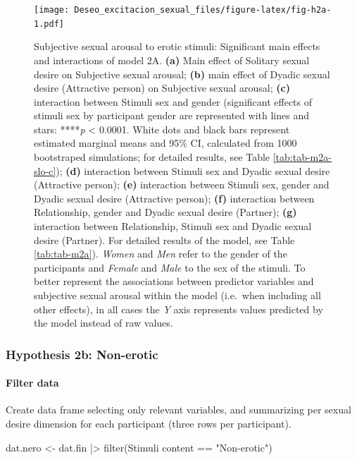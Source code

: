 \documentclass[
  bookmarksnumbered]{article}
\newenvironment{Shaded}{\begin{snugshade}}{\end{snugshade}}
\newcommand{\AttributeTok}[1]{\textcolor[rgb]{0.80,0.80,0.80}{#1}}
\newcommand{\FunctionTok}[1]{\textcolor[rgb]{0.94,0.94,0.56}{#1}}
\newcommand{\NormalTok}[1]{\textcolor[rgb]{0.80,0.80,0.80}{#1}}
\newcommand{\OtherTok}[1]{\textcolor[rgb]{0.94,0.94,0.56}{#1}}
\newcommand{\SpecialCharTok}[1]{\textcolor[rgb]{0.86,0.64,0.64}{#1}}
\newcommand{\StringTok}[1]{\textcolor[rgb]{0.80,0.58,0.58}{#1}}
\begin{document}
\begin{figure}
\centering
\texttt{[image: Deseo\_excitacion\_sexual\_files/figure-latex/fig-h2a-1.pdf]}
\caption{\label{fig:fig-h2a}Subjective sexual arousal to erotic stimuli: Significant main effects and interactions of model 2A. \textbf{(a)} Main effect of Solitary sexual desire on Subjective sexual arousal; \textbf{(b)} main effect of Dyadic sexual desire (Attractive person) on Subjective sexual arousal; \textbf{(c)} interaction between Stimuli sex and gender (significant effects of stimuli sex by participant gender are represented with lines and stars: ****\emph{p} \textless{} 0.0001. White dots and black bars represent estimated marginal means and 95\% CI, calculated from 1000 bootstraped simulations; for detailed results, see Table \ref{tab:tab-m2a-slo-c}); \textbf{(d)} interaction between Stimuli sex and Dyadic sexual desire (Attractive person); \textbf{(e)} interaction between Stimuli sex, gender and Dyadic sexual desire (Attractive person); \textbf{(f)} interaction between Relationship, gender and Dyadic sexual desire (Partner); \textbf{(g)} interaction between Relationship, Stimuli sex and Dyadic sexual desire (Partner). For detailed results of the model, see Table \ref{tab:tab-m2a}). \emph{Women} and \emph{Men} refer to the gender of the participants and \emph{Female} and \emph{Male} to the sex of the stimuli. To better represent the associations between predictor variables and subjective sexual arousal within the model (i.e.~when including all other effects), in all cases the \emph{Y} axis represents values predicted by the model instead of raw values.}
\end{figure}

\hypertarget{hypothesis2b}{%
\subsubsection{Hypothesis 2b: Non-erotic}\label{hypothesis2b}}

\hypertarget{filter-data-2}{%
\paragraph{Filter data}\label{filter-data-2}}

Create data frame selecting only relevant variables, and summarizing per sexual desire dimension for each participant (three rows per participant).

\begin{Shaded}
\begin{Highlighting}[]
\NormalTok{dat.nero }\OtherTok{\textless{}{-}}\NormalTok{ dat.fin }\SpecialCharTok{|\textgreater{}}
  \FunctionTok{filter}\NormalTok{(}\StringTok{\textasciigrave{}}\AttributeTok{Stimuli content}\StringTok{\textasciigrave{}} \SpecialCharTok{==} \StringTok{"Non{-}erotic"}\NormalTok{)}
\end{Highlighting}
\end{Shaded}
\end{document}
